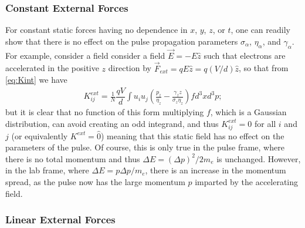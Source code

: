 \subsubsection{Constant External Forces}

For constant static forces having no dependence in $ x $, $ y $, $ z $, or $ t $, one can readily show that there is no effect on the pulse propagation parameters $ \sigma_{ \alpha } $, $ \eta_{ \alpha } $, and $ \gamma_{ \alpha } $.
For example, consider a field consider a field $ \vec{E} = -E \hat{z} $ such that electrons are accelerated in the positive $ z $ direction by $ \vec{F}_{ext} = qE \hat{z} = q ( V / d ) \hat{z} $, so that from \ref{eq:Kint} we have
\begin{equation}
 \begin{split} 
  K^{ext}_{ij} = \frac{1} {N} \dfrac{qV} {d} \int{ u_{i} u_{j} \left( \frac{p_{z}} {\eta_{z}} - \frac{\gamma_{z} z} {\sigma_{z} \eta_{z}} \right) f d^{3}x   d^{3}p } ;
 \end{split}
\end{equation}
but it is clear that no function of this form multiplying $ f $, which is a Gaussian distribution, can avoid creating an odd integrand, and thus $ K_{ij}^{ext} = 0 $ for all $ i $ and $ j $ (or equivalently $ K^{ext} = \hat{0} $) meaning that this static field has no effect on the parameters of the pulse.
Of course, this is only true in the pulse frame, where there is no total momentum and thus $ \Delta E = \left( \Delta p \right)^{2} / 2 m_{e} $ is unchanged.
However, in the lab frame, where  $ \Delta E = p \Delta p / m_{e} $, there is an increase in the momentum spread, as the pulse now has the large momentum $p$ imparted by the accelerating field.

\subsubsection{Linear External Forces}


